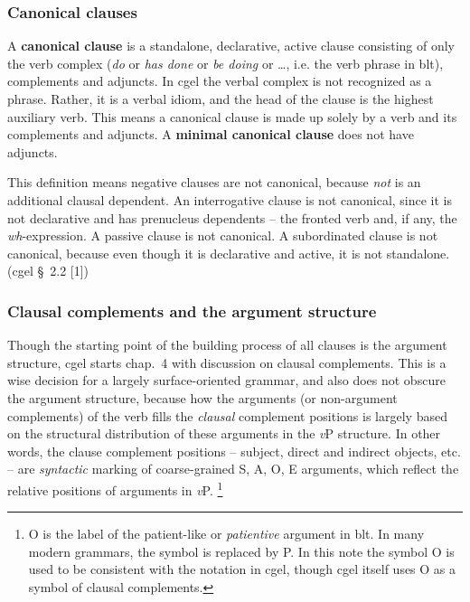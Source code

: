 \documentclass{article}
\newcommand*{\citesec}[1]{\S~{#1}}
\newcommand*{\citechap}[1]{chap.~{#1}}
\newcommand*{\concept}[1]{\textbf{#1}}
\newcommand*{\term}[1]{\emph{#1}}
\newcommand*{\corpus}[1]{\emph{#1}}
\newcommand*{\vP}{\textit{v}P}
\begin{document}
\subsubsection{Canonical clauses}

A \concept{canonical clause} is a standalone, declarative, active clause 
consisting of only the verb complex 
(\emph{do} or \emph{has done} or \emph{be doing} or \dots, i.e. the verb phrase in \ac{blt}), 
complements and adjuncts. 
In \ac{cgel} the verbal complex is not recognized as a phrase.
Rather, it is a verbal idiom, and the head of the clause is the highest auxiliary verb. %
This means a canonical clause is made up solely by a verb and its complements and adjuncts.
A \concept{minimal canonical clause} does not have adjuncts.

This definition means negative clauses are not canonical,
because \corpus{not} is an additional clausal dependent.
An interrogative clause is not canonical,
since it is not declarative and has prenucleus dependents 
-- the fronted verb and, if any, the \term{wh}-expression.
A passive clause is not canonical.
A subordinated clause is not canonical, 
because even though it is declarative and active,
it is not standalone.
(\ac{cgel} \citesec{2.2} [1])


\subsubsection{Clausal complements and the argument structure}

Though the starting point of the building process of all clauses is the argument structure,
\ac{cgel} starts \citechap{4} with discussion on clausal complements.
This is a wise decision for a largely surface-oriented grammar,
and also does not obscure the argument structure, 
because how the arguments (or non-argument complements) of the verb 
fills the \emph{clausal} complement positions
is largely based on the structural distribution of these arguments in the \vP{} structure.
In other words, the clause complement positions -- subject, direct and indirect objects, etc. --
are \emph{syntactic} marking of coarse-grained S, A, O, E arguments,
which reflect the relative positions of arguments in \vP.%
\footnote{
    O is the label of the patient-like or \term{patientive} argument in \ac{blt}.
    In many modern grammars, the symbol is replaced by P.
    In this note the symbol O is used to be consistent with the notation in \ac{cgel}, 
    though \ac{cgel} itself uses O as a symbol of clausal complements.
}
\end{document}
